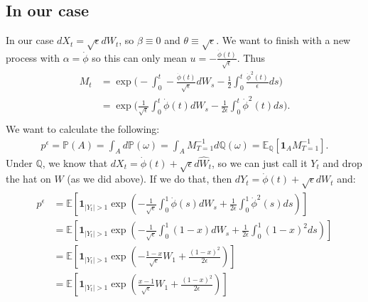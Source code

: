 \documentclass[11pt]{amsart}
\newcommand{\noise}{\sqrt{\epsilon}}
\begin{document}
\subsection{In our case}
In our case $dX_t = \noise dW_t$, so $\beta \equiv 0$ and $\theta \equiv \noise$.
We want to finish with a new process with $\alpha = \dot{\phi}$ so this can only
mean $u = -\frac{\dot{\phi}(t)}{\noise}$. Thus
\begin{align*}
  M_t &= \exp \bigg ( - \int_0^t -\frac{\dot{\phi}(t)}{\noise}dW_s 
  -\frac{1}{2} \int_0^t \frac{\dot{\phi}^2(t)}{\epsilon}ds \bigg ) \\
  &=  \exp \bigg ( \frac{1}{\noise} \int_0^t \dot{\phi}(t)dW_s 
  -\frac{1}{2\epsilon} \int_0^t \dot{\phi}^2(t)ds \bigg ). \\
\end{align*}
We want to calculate the following:
\begin{align*}
  p^{\epsilon} = \mathbb{P}(A) = \int_A d\mathbb{P}(\omega) = 
  \int_A M_{T=1}^{-1} d\mathbb{Q}(\omega) = \mathbb{E}_{\mathbb{Q}}[\mathbf{1}_{A} M_{T=1}^{-1}].
\end{align*}
Under $\mathbb{Q}$, we know that $dX_t = \dot{\phi}(t) + \noise d\hat{W}_t$, so 
we can just call it $Y_t$ and drop the hat on $W$ (as we did above). If we do that,
then $dY_t = \dot{\phi}(t) + \noise dW_t$ and:
\begin{align}
  \begin{split}
  p^{\epsilon} &= \mathbb{E}\left [ \mathbf{1}_{ |Y_t| > 1 } \exp \left (
      -\frac{1}{\noise} \int_0^1 \dot{\phi}(s)dW_s  
      +\frac{1}{2\epsilon} \int_0^1 \dot{\phi}^2(s)ds \right ) \right ] \\
  &= \mathbb{E}\left [ \mathbf{1}_{ |Y_t| > 1 } \exp \left (
      -\frac{1}{\noise} \int_0^1 (1-x) dW_s  
      +\frac{1}{2\epsilon} \int_0^1 (1-x)^2 ds \right ) \right ] \\
  &= \mathbb{E}\left [ \mathbf{1}_{ |Y_t| > 1 } \exp \left (
      -\frac{1-x}{\noise} W_1 +\frac{(1-x)^2}{2\epsilon} \right ) \right ] \\
  &= \mathbb{E}\left [ \mathbf{1}_{ |Y_t| > 1 } \exp \left (
     \frac{x-1}{\noise} W_1 +\frac{(1-x)^2}{2\epsilon} \right ) \right ] \\
 \end{split}
\end{align}
\end{document}
